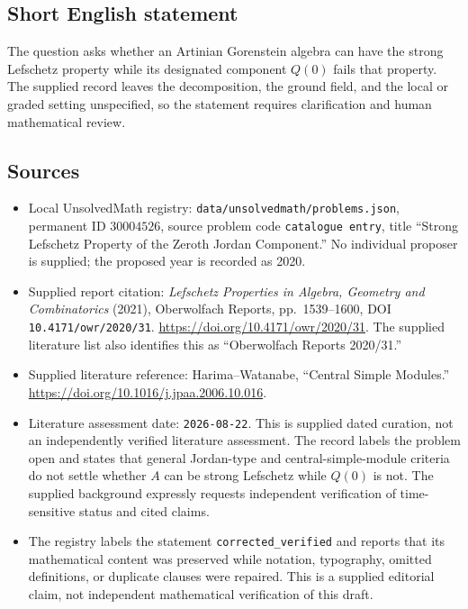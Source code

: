 \documentclass[11pt]{article}
\begin{document}
\subsection{Short English statement}
The question asks whether an Artinian Gorenstein algebra can have the strong Lefschetz property while its designated component \(Q(0)\) fails that property. The supplied record leaves the decomposition, the ground field, and the local or graded setting unspecified, so the statement requires clarification and human mathematical review.
\subsection{Sources}
\begin{itemize}
\item Local UnsolvedMath registry: \texttt{data/unsolvedmath/problems.json}, permanent ID \(30004526\), source problem code \texttt{catalogue entry}, title ``Strong Lefschetz Property of the Zeroth Jordan Component.'' No individual proposer is supplied; the proposed year is recorded as 2020.
\item Supplied report citation: \emph{Lefschetz Properties in Algebra, Geometry and Combinatorics} (2021), Oberwolfach Reports, pp.\ 1539--1600, DOI \texttt{10.4171/owr/2020/31}. \url{https://doi.org/10.4171/owr/2020/31}. The supplied literature list also identifies this as ``Oberwolfach Reports 2020/31.''
\item Supplied literature reference: Harima--Watanabe, ``Central Simple Modules.'' \url{https://doi.org/10.1016/j.jpaa.2006.10.016}.
\item Literature assessment date: \texttt{2026-08-22}. This is supplied dated curation, not an independently verified literature assessment. The record labels the problem open and states that general Jordan-type and central-simple-module criteria do not settle whether \(A\) can be strong Lefschetz while \(Q(0)\) is not. The supplied background expressly requests independent verification of time-sensitive status and cited claims.
\item The registry labels the statement \texttt{corrected\_verified} and reports that its mathematical content was preserved while notation, typography, omitted definitions, or duplicate clauses were repaired. This is a supplied editorial claim, not independent mathematical verification of this draft.
\end{itemize}
\end{document}
